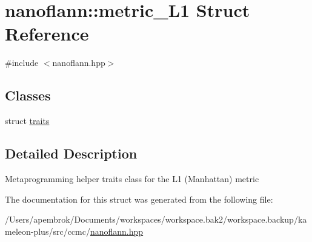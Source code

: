 \hypertarget{structnanoflann_1_1metric___l1}{\section{nanoflann\-:\-:metric\-\_\-\-L1 Struct Reference}
\label{structnanoflann_1_1metric___l1}
}


{\ttfamily \#include $<$nanoflann.\-hpp$>$}

\subsection*{Classes}
\begin{DoxyCompactItemize}
\item 
struct \hyperlink{structnanoflann_1_1metric___l1_1_1traits}{traits}
\end{DoxyCompactItemize}


\subsection{Detailed Description}
Metaprogramming helper traits class for the L1 (Manhattan) metric 

The documentation for this struct was generated from the following file\-:\begin{DoxyCompactItemize}
\item 
/\-Users/apembrok/\-Documents/workspaces/workspace.\-bak2/workspace.\-backup/kameleon-\/plus/src/ccmc/\hyperlink{nanoflann_8hpp}{nanoflann.\-hpp}\end{DoxyCompactItemize}
